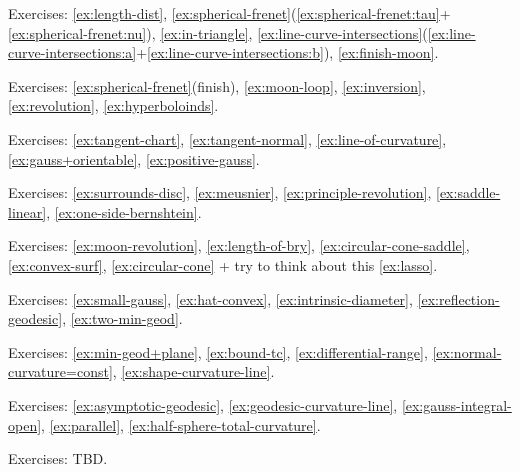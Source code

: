 \noindent{\rule{\textwidth}{.1mm}}


Exercises:
\ref{ex:length-dist},
\ref{ex:spherical-frenet}(\ref{ex:spherical-frenet:tau}+\ref{ex:spherical-frenet:nu}),
\ref{ex:in-triangle},
\ref{ex:line-curve-intersections}(\ref{ex:line-curve-intersections:a}+\ref{ex:line-curve-intersections:b}),
\ref{ex:finish-moon}.

Exercises:
\ref{ex:spherical-frenet}(finish),
\ref{ex:moon-loop},
\ref{ex:inversion},
\ref{ex:revolution},
\ref{ex:hyperboloinds}.

Exercises:
\ref{ex:tangent-chart},
\ref{ex:tangent-normal},
\ref{ex:line-of-curvature},
\ref{ex:gauss+orientable},
\ref{ex:positive-gauss}.

Exercises:
\ref{ex:surrounds-disc},
\ref{ex:meusnier},
\ref{ex:principle-revolution},
\ref{ex:saddle-linear},
\ref{ex:one-side-bernshtein}.

Exercises:
\ref{ex:moon-revolution}, 
\ref{ex:length-of-bry},
\ref{ex:circular-cone-saddle},
\ref{ex:convex-surf},
\ref{ex:circular-cone} 
+ try to think about this \ref{ex:lasso}.

Exercises:
\ref{ex:small-gauss},
\ref{ex:hat-convex},
\ref{ex:intrinsic-diameter},
\ref{ex:reflection-geodesic},
\ref{ex:two-min-geod}.

Exercises:
\ref{ex:min-geod+plane},
\ref{ex:bound-tc},
\ref{ex:differential-range},
\ref{ex:normal-curvature=const},
\ref{ex:shape-curvature-line}.

Exercises: 
\ref{ex:asymptotic-geodesic},
\ref{ex:geodesic-curvature-line},
\ref{ex:gauss-integral-open},
\ref{ex:parallel},
\ref{ex:half-sphere-total-curvature}.



Exercises: TBD.

\noindent{\rule{\textwidth}{.1mm}}

